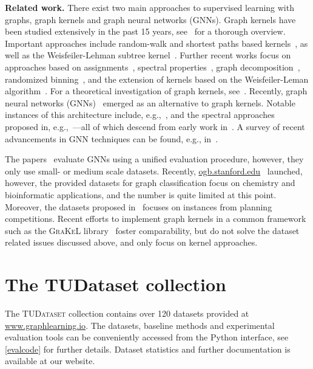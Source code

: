 \documentclass{article}
\newcommand{\xhdr}[1]{{\noindent\bfseries #1}}
\theoremstyle{definition}
\begin{document}
\xhdr{Related work.}
There exist two main approaches to supervised learning with graphs, graph kernels and graph neural networks (GNNs). Graph kernels have been studied extensively in the past 15 years, see~\cite{Kri+2019} for a thorough overview. Important approaches include random-walk and shortest paths based kernels~\cite{Gae+2003,Sugiyama2015,Bor+2005,Kri+2017b}, as well as the Weisfeiler-Lehman subtree kernel~\cite{She+2011,Mor+2017}. 
Further recent works focus on approaches based on assignments~\cite{Kri+2016,Nik+2017}, spectral properties~\cite{Kon+2016}, graph decomposition~\cite{Nik+2018}, randomized binning~\cite{Hei+2019}, and the extension of kernels based on the Weisfeiler-Leman algorithm~\cite{Tog+2019, Rie+2019}. For a theoretical investigation of graph kernels, see~\cite{Kri+2018}. Recently, graph neural networks (GNNs)~\cite{Gil+2017,Sca+2009} emerged as an alternative to graph kernels. Notable instances of this architecture include, e.g.,~\cite{Duv+2015,Ham+2017,Vel+2018}, and the spectral approaches proposed in, e.g.,~\cite{Bru+2014,Def+2015,Kip+2017,Mon+2017}---all of which descend from early work in~\cite{Kir+1995,Mer+2005,Spe+1997,Sca+2009}. A survey of recent advancements in GNN techniques can be found, e.g., in~\cite{Cha+2020,Wu+2019,Zho+2018}.

The papers~\cite{Fey+2019,Che+2019new,Err+2019,Dwi+2020} evaluate GNNs using a unified evaluation procedure, however, they only use small- or medium scale datasets. Recently, \url{ogb.stanford.edu}~\cite{Hu+2020} launched, however, the provided datasets for graph classification focus on chemistry and bioinformatic applications, and the number is quite limited at this point. Moreover, the datasets proposed in~\cite{Fer+2019} focuses on instances from planning competitions. 
Recent efforts to implement graph kernels in a common framework such as the \textsc{GraKeL} library~\cite{Sig+2018} foster comparability, but do not solve the dataset related issues discussed above, and only focus on kernel approaches.


\section{The TUDataset collection}

The \textsc{TUDataset} collection contains over 120 datasets provided at \url{www.graphlearning.io}. The datasets, baseline methods and experimental evaluation tools can be conveniently accessed from the Python interface, see \cref{evalcode} for further details. Dataset statistics and further documentation is available at our website.
\end{document}
